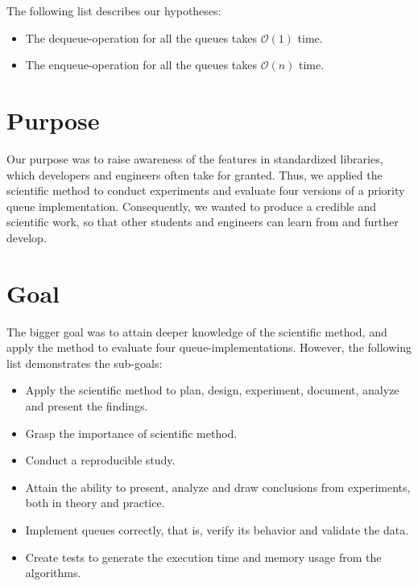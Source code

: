\documentclass[a4paper,11pt]{kth-mag}
\newcommand*{\skippara}{\par\vspace{\baselineskip} \noindent}
\begin{document}
\skippara The following list describes our hypotheses:
\begin{itemize}
    \item The dequeue-operation for all the queues takes $\mathcal{O}(1)$ time.
    \item The enqueue-operation for all the queues takes $\mathcal{O}(n)$ time.
\end{itemize}

\section{Purpose}
Our purpose was to raise awareness of the features in standardized libraries, which developers and engineers often take for granted.
Thus, we applied the scientific method to conduct experiments and evaluate four versions of a priority queue implementation.
Consequently, we wanted to produce a credible and scientific work, so that other students and engineers can learn from and further develop.

\section{Goal}
The bigger goal was to attain deeper knowledge of the scientific method, and apply the method to evaluate four queue-implementations.
However, the following list demonstrates the sub-goals:
\begin{itemize}
    \item Apply the scientific method to plan, design, experiment, document, analyze and present the findings.
    \item Grasp the importance of scientific method.
    \item Conduct a reproducible study.
    \item Attain the ability to present, analyze and draw conclusions from experiments, both in theory and practice.
    \item Implement queues correctly, that is, verify its behavior and validate the data.
    \item Create tests to generate the execution time and memory usage from the algorithms.
\end{itemize}

\end{document}
